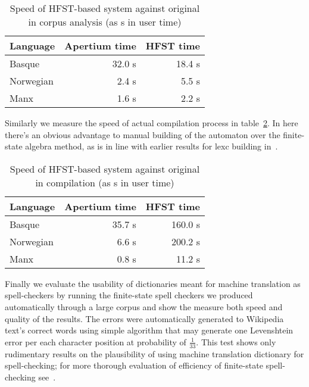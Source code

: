 \documentclass[10pt,a4paper]{article}
\begin{document}
\begin{table}[h]
\begin{center}
\begin{tabular}{|l|r|r|}
\hline
\bf Language & \bf Apertium time & \bf HFST time \\
\hline
Basque       & 32.0 s& 18.4 s \\
Norwegian    & 2.4 s & 5.5  s \\
Manx         & 1.6 s & 2.2  s \\
\hline
\end{tabular}
\caption{Speed of HFST-based system against original in corpus analysis
 (as s in user time)
\label{table:speed}}
\end{center}
\end{table}

Similarly we measure the speed of actual compilation process in 
table~\ref{table:compile-speed}. In here there's an obvious advantage to
manual building of the automaton over the finite-state algebra method, as is
in line with earlier results for lexc building in~\cite{pirinen/2009/sfcm}.

\begin{table}[h]
\begin{center}
\begin{tabular}{|l|r|r|}
\hline
\bf Language & \bf Apertium time & \bf HFST time \\
\hline
Basque       & 35.7 s & 160.0  s \\
Norwegian    & 6.6 s  & 200.2 s \\
Manx         & 0.8 s  & 11.2  s \\
\hline
\end{tabular}
\caption{Speed of HFST-based system against original in compilation
 (as s in user time)
\label{table:compile-speed}}
\end{center}
\end{table}

Finally we evaluate the usability of dictionaries meant for machine translation
as spell-checkers by running the finite-state spell checkers we produced
automatically through a large corpus and show the measure both speed and
quality of the results. The errors were automatically generated to Wikipedia
text's correct words using simple algorithm that may generate one Levenshtein
error per each character position at probability of $\frac{1}{33}$.  This test
shows only rudimentary results on the plausibility of using machine translation
dictionary for spell-checking; for more thorough evaluation of efficiency of
finite-state spell-checking see~\cite{hassan/2008}.
\end{document}
